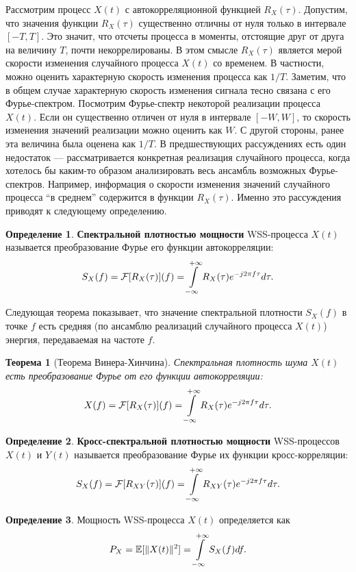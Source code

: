 \documentclass{book}
\newtheorem{theorem}{Теорема}
\numberwithin{theorem}{chapter}
\numberwithin{statement}{chapter}
\numberwithin{lemma}{chapter}
\theoremstyle{definition}
\numberwithin{task}{chapter}
\theoremstyle{remark}
\numberwithin{example}{chapter}
\theoremstyle{definition}
\newtheorem{definition}{Определение}
\numberwithin{definition}{chapter}
\theoremstyle{remark}
\theoremstyle{remark}
\numberwithin{lyrics}{section}
\begin{document}
Рассмотрим процесс $X(t)$ с автокорреляционной функцией $R_X(\tau)$. Допустим, что значения функции $R_X(\tau)$ существенно отличны от нуля только в интервале $[-T, T]$. Это значит, что отсчеты процесса в моменты, отстоящие друг от друга на величину $T$, почти некоррелированы. В этом смысле $R_X(\tau)$ является мерой скорости изменения случайного процесса $X(t)$ со временем. В частности, можно оценить характерную скорость изменения процесса как $1/T$. Заметим, что в общем случае характерную скорость изменения сигнала тесно связана с его Фурье-спектром. Посмотрим Фурье-спектр некоторой реализации процесса $X(t)$. Если он существенно отличен от нуля в интервале $[-W, W]$, то скорость изменения значений реализации можно оценить как $W$. С другой стороны, ранее эта величина была оценена как $1/T$.
В предшествующих рассуждениях есть один недостаток --- рассматривается конкретная реализация случайного процесса, когда хотелось бы каким-то образом анализировать весь ансамбль возможных Фурье-спектров. Например, информация о скорости изменения значений случайного процесса ``в среднем'' содержится в функции $R_X(\tau)$. Именно это рассуждения приводят к следующему определению.
\begin{definition}
\textbf{Спектральной плотностью мощности} WSS-процесса $X(t)$ называется преобразование Фурье его функции автокорреляции:
$$
S_X(f) = \mathcal{F}[R_X(\tau)](f) = \int\limits_{-\infty}^{+\infty} R_X(\tau) e^{-j2\pi f \tau} d\tau. 
$$
\end{definition}
Следующая теорема показывает, что значение спектральной плотности $S_X(f)$ в точке $f$ есть средняя (по ансамблю реализаций случайного процесса $X(t)$) энергия, передаваемая на частоте $f$.
\begin{theorem}[Теорема Винера-Хинчина]Спектральная плотность шума $X(t)$ есть преобразование Фурье от его функции автокорреляции:
$$
X(f) = \mathcal{F}[R_X(\tau)](f) = \int\limits_{-\infty}^{+\infty} R_X(\tau) e^{-j2\pi f \tau} d\tau.
$$
\end{theorem}

\begin{definition}
\textbf{Кросс-спектральной плотностью мощности} WSS-процессов $X(t)$ и $Y(t)$ называется преобразование Фурье их функции кросс-корреляции:
$$
S_X(f) = \mathcal{F}[R_{XY}(\tau)](f) = \int\limits_{-\infty}^{+\infty} R_{XY}(\tau) e^{-j2\pi f \tau} d\tau. 
$$
\end{definition}


\begin{definition}
Мощность WSS-процесса $X(t)$ определяется как
$$
P_X = \mathbb{E}[\|X(t)\|^2] = \int\limits_{-\infty}^{+\infty} S_X(f) df.
$$
\end{definition}
\end{document}
